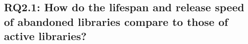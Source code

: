 





\subsection{RQ2.1: How do the lifespan and release speed of abandoned libraries compare to those of active libraries?}







